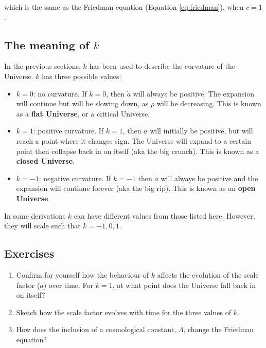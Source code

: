 \documentclass[11pt,a4paper,notoc]{tufte-handout}
\begin{document}
which is the same as the Friedman equation
(Equation \eqref{eq:friedman}), when \(c=1\).

\hypertarget{sec:curvature}{%
\subsection{\texorpdfstring{The meaning of \(k\)}{The meaning of k}}\label{sec:curvature}}

In the previous sections, \(k\) has been used to describe the curvature of
the Universe. \(k\) has three possible values:

\begin{itemize}
\item
  \(k = 0\): no curvature. If \(k=0\), then \(\dot{a}\) will always be
  positive. The expansion will continue but will be slowing down, as
  \(\rho\) will be decreasing. This is known as a \textbf{flat Universe}, or
  a critical Universe.
\item
  \(k = 1\): positive curvature. If \(k = 1\), then \(\dot{a}\) will
  initially be positive, but will reach a point where it changes sign.
  The Universe will expand to a certain point then collapse back in on
  itself (aka the big crunch). This is known as a \textbf{closed Universe}.
\item
  \(k = -1\): negative curvature. If \(k=-1\) then \(\dot{a}\) will always
  be positive and the expansion will continue forever (aka the big
  rip). This is known as an \textbf{open Universe}.
\end{itemize}

In some derivations \(k\) can have different values from those
listed here. However, they will scale such that \(k = -1, 0, 1\).

\hypertarget{sec:geometry-ex}{%
\subsection{Exercises}\label{sec:geometry-ex}}

\begin{enumerate}
\def\labelenumi{\arabic{enumi}.}
\item
  Confirm for yourself how the behaviour of \(k\) affects the evolution
  of the scale factor (\(a\)) over time. For \(k=1\), at what point does
  the Universe fall back in on itself?
\item
  Sketch how the scale factor evolves with time for the three values
  of \(k\).
\item
  How does the inclusion of a cosmological constant, \(\Lambda\), change
  the Friedman equation?
\end{enumerate}
\end{document}
